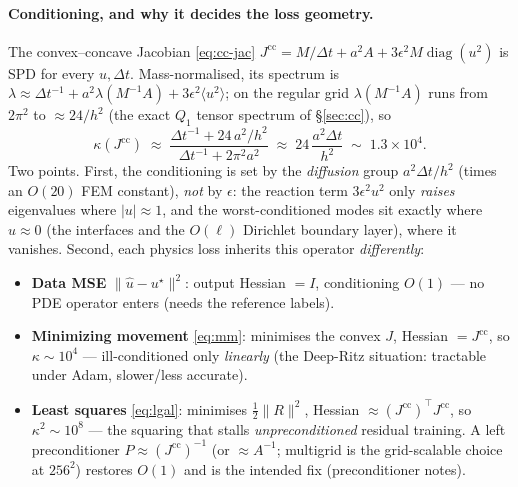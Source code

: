 \documentclass[11pt]{article}
\newcommand{\dt}{\Delta t}
\newcommand{\uhat}{\hat u}
\DeclareMathOperator{\diag}{diag}
\begin{document}
\paragraph{Conditioning, and why it decides the loss geometry.}
The convex--concave Jacobian \eqref{eq:cc-jac} $J^{\mathrm{cc}}=M/\dt+a^2A+3\epsilon^2M\diag(u^2)$
is SPD for every $u,\dt$. Mass-normalised, its spectrum is
$\lambda\approx\dt^{-1}+a^2\lambda(M^{-1}A)+3\epsilon^2\langle u^2\rangle$; on the regular grid
$\lambda(M^{-1}A)$ runs from $2\pi^2$ to $\approx24/h^2$ (the exact $Q_1$ tensor spectrum of
\S\ref{sec:cc}), so
\[
  \kappa(J^{\mathrm{cc}})\;\approx\;
  \frac{\dt^{-1}+24\,a^2/h^2}{\dt^{-1}+2\pi^2a^2}
  \;\approx\; 24\,\frac{a^2\dt}{h^2}
  \;\sim\; 1.3\times10^{4}.
\]
Two points. First, the conditioning is set by the \emph{diffusion} group $a^2\dt/h^2$ (times an
$O(20)$ FEM constant), \emph{not} by $\epsilon$: the reaction term $3\epsilon^2u^2$ only
\emph{raises} eigenvalues where $|u|\approx1$, and the worst-conditioned modes sit exactly where
$u\approx0$ (the interfaces and the $O(\ell)$ Dirichlet boundary layer), where it vanishes.
Second, each physics loss inherits this operator \emph{differently}:
\begin{itemize}\itemsep2pt
  \item \textbf{Data MSE} $\|\uhat-u^\star\|^2$: output Hessian $=I$, conditioning $O(1)$ --- no PDE
        operator enters (needs the reference labels).
  \item \textbf{Minimizing movement} \eqref{eq:mm}: minimises the convex $J$, Hessian $=J^{\mathrm{cc}}$,
        so $\kappa\sim10^4$ --- ill-conditioned only \emph{linearly} (the Deep-Ritz situation:
        tractable under Adam, slower/less accurate).
  \item \textbf{Least squares} \eqref{eq:lgal}: minimises $\tfrac12\|R\|^2$, Hessian
        $\approx(J^{\mathrm{cc}})^\top J^{\mathrm{cc}}$, so $\kappa^2\sim10^{8}$ --- the squaring that
        stalls \emph{unpreconditioned} residual training. A left preconditioner
        $P\approx(J^{\mathrm{cc}})^{-1}$ (or $\approx A^{-1}$; multigrid is the grid-scalable choice at
        $256^2$) restores $O(1)$ and is the intended fix (preconditioner notes).
\end{itemize}
\end{document}
